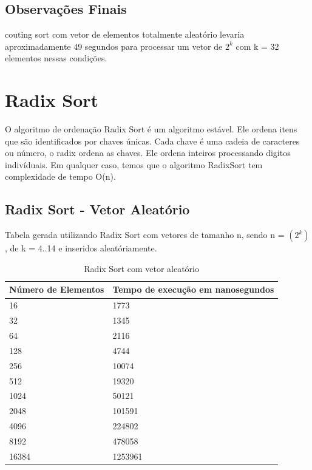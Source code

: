 \documentclass[12pt,a4paper,twoside]{report}
\begin{document}
\section{Observações Finais}
couting sort com vetor de elementos totalmente aleatório levaria aproximadamente 49 segundos para processar um vetor de $2^k$ com k = 32 elementos nessas condições.

\chapter{Radix Sort}
O algoritmo de ordenação Radix Sort é um algoritmo estável. Ele ordena itens que são identificados por chaves únicas. Cada chave é uma cadeia de caracteres ou número, o radix ordena as chaves. Ele ordena inteiros processando digitos indivíduais.
Em qualquer caso, temos que o algoritmo RadixSort tem complexidade de tempo O(n).

\section{Radix Sort - Vetor Aleatório}
Tabela gerada utilizando Radix Sort com vetores de tamanho n, sendo n = $(2^k)$, de k = 4..14 e inseridos aleatóriamente.
\begin{table}[H]
\centering
\caption{Radix Sort com vetor aleatório}
\label{my-label}
\begin{tabular}{|l|l|}
\hline
\multicolumn{1}{|c|}{\textbf{Número de Elementos}} & \multicolumn{1}{c|}{\textbf{Tempo de execução em nanosegundos}} \\ \hline
16 & 1773 \\ \hline
32 & 1345 \\ \hline
64 & 2116 \\ \hline
128 & 4744 \\ \hline
256 & 10074 \\ \hline
512 & 19320 \\ \hline
1024 & 50121 \\ \hline
2048 & 101591 \\ \hline
4096 & 224802 \\ \hline
8192 & 478058 \\ \hline
16384 & 1253961 \\ \hline
\end{tabular}
\end{table}
\end{document}
